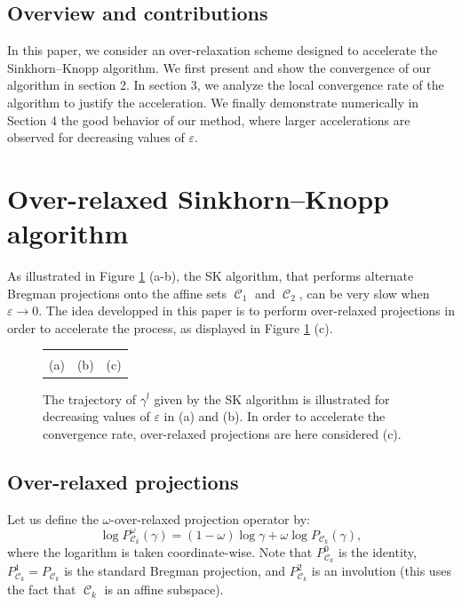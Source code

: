 \documentclass{article} %
\DeclareMathOperator{\Ccal}{\mathcal{C}}
\renewcommand{\epsilon}{\varepsilon}
\theoremstyle{plain}
\theoremstyle{definition}
\theoremstyle{remark}
\begin{document}
\subsection{Overview and contributions}
In this paper, we consider an over-relaxation scheme designed to accelerate the Sinkhorn--Knopp algorithm. We first present and show the convergence of our algorithm in section 2. In section 3, we analyze the local convergence rate of the algorithm to justify the acceleration.
We finally demonstrate numerically  in Section 4 the good behavior of our method, where larger accelerations are observed for decreasing values of $\epsilon$.



\section{Over-relaxed Sinkhorn--Knopp algorithm}

As illustrated in Figure \ref{alternate_projections} (a-b), the SK algorithm, that  performs alternate Bregman projections onto the affine sets $\Ccal_1$ and $\Ccal_2$, can be very slow when $\epsilon\to 0$. The idea developped in this paper is to perform over-relaxed projections in order to accelerate the process, as displayed in Figure \ref{alternate_projections} (c).

\begin{figure}[ht!]
\begin{center}
\begin{tabular}{ccc}
&
&
\\
(a)&(b)&(c)
\end{tabular}
\caption{\label{alternate_projections} The trajectory of $\gamma^l$ given by the SK algorithm is illustrated for decreasing values of $\epsilon$ in (a) and (b). In order to accelerate the convergence rate, over-relaxed projections are here considered (c).}
\end{center}
\end{figure}
\subsection{Over-relaxed projections}

Let us define the $\omega$-over-relaxed projection operator by:
\begin{equation}\label{eq:def_or_proj}
\log P^\omega_{\Ccal_k}(\gamma) = (1-\omega) \log \gamma + \omega \log P_{\Ccal_k}(\gamma),
\end{equation}
where the logarithm is taken coordinate-wise.
Note that $P_{\Ccal_k}^0$ is the identity, $P_{\Ccal_k}^1 = P_{\Ccal_k}$ is the standard Bregman projection, and $P_{\Ccal_k}^2$ is an involution (this uses the fact that $\Ccal_k$ is an affine subspace).
\end{document}
